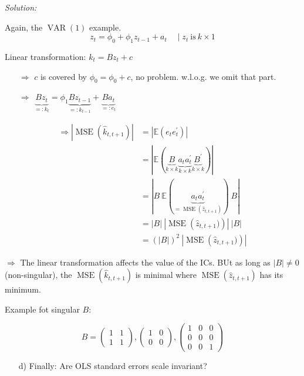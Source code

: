 \documentclass[12pt,a4paper]{article}
\newcommand{\MSE}{\operatorname{MSE}} %
\newcommand{\VAR}{\operatorname{VAR}} %
\begin{document}
\emph{Solution:}

Again, the \(\VAR(1)\) example.
\[z_t = \phi_0 + \phi_1 z_{t-1} +a_t \quad \mid z_t \ \text{is} \ k \times 1 \]

Linear transformation: \(k_t = B z_t + c\)

\begin{itemize}
  \item[$\Rightarrow$] $c$ is covered by $\phi_0 = \phi_0 + c$, no problem. w.l.o.g. we omit that part.
  \item[$\Rightarrow$] $\underbrace{B z_t}_{=: k_t} = \phi_1 \underbrace{B z_{t-1}}_{=: k_{t-1}} + \underbrace{B a_t}_{=: e_t}$
\end{itemize}

\begin{align*}
  \Rightarrow \left| \MSE \left(\hat{k}_{t, t+1} \right) \right| & = \left| \mathbb{E} \left(e_t e_t^{'} \right) \right| \\
  & = \left| \mathbb{E} \left(\underbrace{B}_{k \times k} \underbrace{a_t a_t^{'}}_{k \times k} \underbrace{B^{'}}_{k \times k}\right) \right|\\
  & = \left| B \ \mathbb{E} \left( \underbrace{a_t a_t^{'} }_{= \MSE (\hat{z}_{t, t+1})}\right) \ B \right|\\
  & = \left| B \right| \ \left| \MSE \left( \hat{z}_{t, t+1}) \right) \right| \ \left| B \right| \\
  & = \left(\left| B \right|\right)^2 \ \left| \MSE \left( \hat{z}_{t, t+1}) \right) \right| 
\end{align*}

\(\Rightarrow\) The linear transformation affects the value of the ICs.
BUt as long as \(|B| \neq 0\) (non-singular), the
\(\MSE\left( \hat{k}_{t,t+1} \right)\) is minimal where
\(\MSE\left( \hat{z}_{t,t+1} \right)\) has its minimum.

Example fot singular \(B\):

\[B = \begin{pmatrix} 1 & 1 \\ 1 & 1 \end{pmatrix}, \begin{pmatrix} 1 & 0 \\ 0 & 0 \end{pmatrix}, \begin{pmatrix} 1 & 0 & 0 \\ 0 & 0 & 0 \\ 0 & 0 & 1 \end{pmatrix}\]

\begin{itemize}
  \item[d)] Finally: Are OLS standard errors scale invariant? 
\end{itemize}
\end{document}
